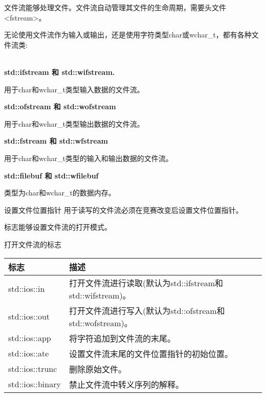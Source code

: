 
文件流能够处理文件。文件流自动管理其文件的生命周期，需要头文件<fstream>。

无论使用文件流作为输入或输出，还是使用字符类型char或wchar\_t，都有各种文件流类:

\noindent
\\\textbf{std::ifstream 和 std::wifstream.}

用于char和wchar\_t类型输入数据的文件流。

\noindent
\textbf{std::ofstream 和 std::wofstream}

用于char和wchar\_t类型输出数据的文件流。

\noindent
\textbf{std::fstream 和 std::wfstream}

用于char和wchar\_t类型的输入和输出数据的文件流。

\noindent
\textbf{std::filebuf 和 std::wfilebuf}

类型为char和wchar\_t的数据内存。\\

\begin{myWarning}{设置文件位置指针}
用于读写的文件流必须在竞赛改变后设置文件位置指针。
\end{myWarning}

标志能够设置文件流的打开模式。

\begin{center}
打开文件流的标志
\end{center}

\begin{longtable}[c]{|l|l|}
\hline
\textbf{标志}    & \textbf{描述}                                                             \\ \hline
\endfirsthead
%
\endhead
%
std::ios::in     & 打开文件流进行读取(默认为std::ifstream和std::wifstream)。 \\ \hline
std::ios::out    & 打开文件流进行写入(默认为std::ofstream和std::wofstream)。 \\ \hline
std::ios::app    & 将字符追加到文件流的末尾。                             \\ \hline
std::ios::ate & 设置文件流末尾的文件位置指针的初始位置。 \\ \hline
std::ios::trunc  & 删除原始文件。                                                       \\ \hline
std::ios::binary & 禁止文件流中转义序列的解释。          \\ \hline
\end{longtable}

